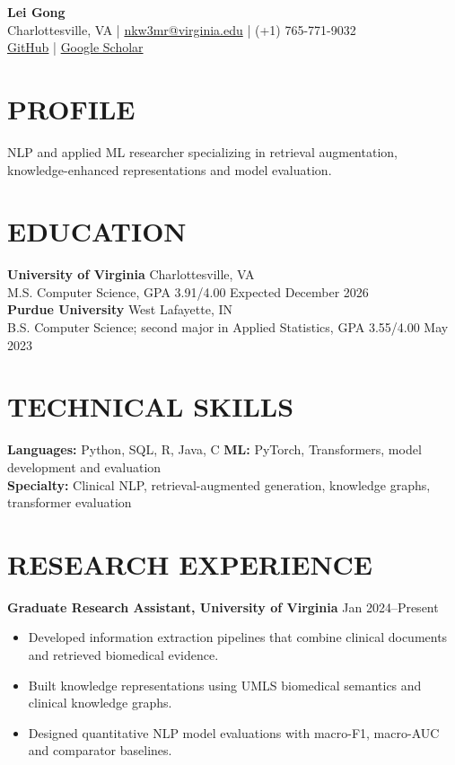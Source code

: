 \documentclass[10pt, letterpaper]{article}
\begin{document}
\setlength{\parindent}{0pt}
\begin{center}
{\fontsize{23}{25}\selectfont\textbf{Lei Gong}}\\[3pt]
Charlottesville, VA \quad | \quad \href{mailto:nkw3mr@virginia.edu}{nkw3mr@virginia.edu} \quad | \quad (+1) 765-771-9032\\[2pt]
\href{https://github.com/LeiGong0125Carrot}{GitHub} \quad | \quad \href{https://scholar.google.com/citations?user=8QLAkKMAAAAJ}{Google Scholar}
\end{center}
\vspace{-3mm}
\section{PROFILE}
NLP and applied ML researcher specializing in retrieval augmentation, knowledge-enhanced representations and model evaluation.
\section{EDUCATION}
\textbf{University of Virginia} \hfill Charlottesville, VA \\
M.S. Computer Science, GPA 3.91/4.00 \hfill Expected December 2026\\[1pt]
\textbf{Purdue University} \hfill West Lafayette, IN \\
B.S. Computer Science; second major in Applied Statistics, GPA 3.55/4.00 \hfill May 2023
\section{TECHNICAL SKILLS}
\textbf{Languages:} Python, SQL, R, Java, C \quad \textbf{ML:} PyTorch, Transformers, model development and evaluation\\
\textbf{Specialty:} Clinical NLP, retrieval-augmented generation, knowledge graphs, transformer evaluation
\section{RESEARCH EXPERIENCE}
\textbf{Graduate Research Assistant, University of Virginia} \hfill Jan 2024--Present
\begin{itemize}
\item Developed information extraction pipelines that combine clinical documents and retrieved biomedical evidence.
\item Built knowledge representations using UMLS biomedical semantics and clinical knowledge graphs.
\item Designed quantitative NLP model evaluations with macro-F1, macro-AUC and comparator baselines.
\end{itemize}
\end{document}
